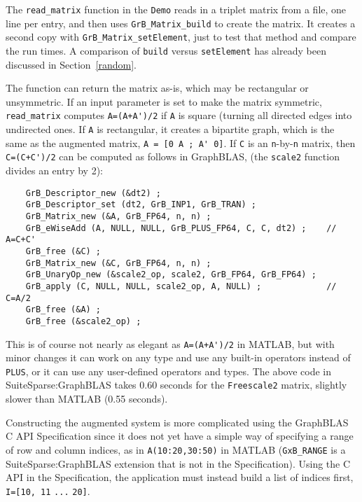 \documentclass[12pt]{article}
\begin{document}
The \verb'read_matrix' function in the \verb'Demo' reads in a triplet matrix
from a file, one line per entry, and then uses \verb'GrB_Matrix_build' to
create the matrix.  It creates a second copy with \verb'GrB_Matrix_setElement',
just to test that method and compare the run times.  A comparison of
\verb'build' versus \verb'setElement' has already been discussed in
Section~\ref{random}.

The function can return the matrix as-is, which may be rectangular or
unsymmetric.  If an input parameter is set to make the matrix symmetric,
\verb'read_matrix' computes \verb"A=(A+A')/2" if \verb'A' is square (turning
all directed edges into undirected ones.  If \verb'A' is rectangular, it
creates a bipartite graph, which is the same as the augmented matrix,
\verb"A = [0 A ; A' 0]".
If \verb'C' is an \verb'n'-by-\verb'n' matrix, then \verb"C=(C+C')/2" can be
computed as follows in GraphBLAS, (the \verb'scale2' function divides an entry
by 2):

    \vspace{-0.05in}
    {\footnotesize
    \begin{verbatim}
    GrB_Descriptor_new (&dt2) ;
    GrB_Descriptor_set (dt2, GrB_INP1, GrB_TRAN) ;
    GrB_Matrix_new (&A, GrB_FP64, n, n) ;
    GrB_eWiseAdd (A, NULL, NULL, GrB_PLUS_FP64, C, C, dt2) ;    // A=C+C'
    GrB_free (&C) ;
    GrB_Matrix_new (&C, GrB_FP64, n, n) ;
    GrB_UnaryOp_new (&scale2_op, scale2, GrB_FP64, GrB_FP64) ;
    GrB_apply (C, NULL, NULL, scale2_op, A, NULL) ;             // C=A/2
    GrB_free (&A) ;
    GrB_free (&scale2_op) ; \end{verbatim}}

This is of course not nearly as elegant as \verb"A=(A+A')/2" in MATLAB, but
with minor changes it can work on any type and use any built-in operators
instead of \verb'PLUS', or it can use any user-defined operators and types.
The above code in SuiteSparse:GraphBLAS takes 0.60 seconds for the
\verb'Freescale2' matrix, slightly slower than MATLAB (0.55 seconds).

Constructing the augmented system is more complicated using the GraphBLAS C API
Specification since it does not yet have a simple way of specifying a range of
row and column indices, as in \verb'A(10:20,30:50)' in MATLAB (\verb'GxB_RANGE'
is a SuiteSparse:GraphBLAS extension that is not in the Specification).  Using
the C API in the Specification, the application must instead build a list of
indices first, \verb'I=[10, 11' \verb'...' \verb'20]'.
\end{document}
